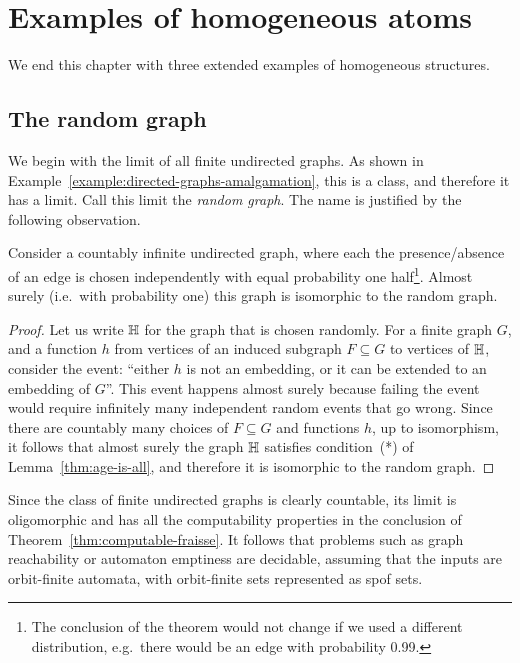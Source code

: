 \section{Examples of homogeneous atoms}
We end this chapter with three extended examples of homogeneous structures. 
\subsection{The random graph}
\label{sec:random-graph}

We begin with  the \fraisse limit of all finite undirected graphs. As shown in Example~\ref{example:directed-graphs-amalgamation}, this is a \fraisse class, and therefore it has a \fraisse limit. Call this limit the \emph{random graph}. The name is justified by the following observation. 

\begin{theorem} 
 Consider a countably infinite undirected graph, where each the presence/absence of an edge is chosen independently with equal probability one half\footnote{The conclusion of the theorem would not change if we used a different distribution, e.g.~there would be an edge with probability 0.99.}. Almost surely (i.e.~with probability one) this graph is isomorphic to the random graph.
\end{theorem} 
\begin{proof}
 Let us write $\mathbb H$ for the graph that is chosen randomly. For a finite graph $G$, and a function $h$ from vertices of an induced subgraph $F \subseteq G$ to vertices of $\mathbb H$, consider the event: ``either $h$ is not an embedding, or it can be extended to an embedding of $G$''. This event happens almost surely because failing the event would require infinitely many independent random events that go wrong. Since there are countably many choices of $F \subseteq G$ and functions $h$, up to isomorphism, it follows that almost surely the graph $\mathbb H$ satisfies condition~(*) of Lemma~\ref{thm:age-is-all}, and therefore it is isomorphic to the random graph.
\end{proof}

Since the class of finite undirected graphs is clearly countable, its \fraisse limit is oligomorphic and has all the computability properties in the conclusion of Theorem~\ref{thm:computable-fraisse}. It follows that problems such as graph reachability or automaton emptiness are decidable, assuming that the inputs are orbit-finite automata, with orbit-finite sets represented as spof sets.

